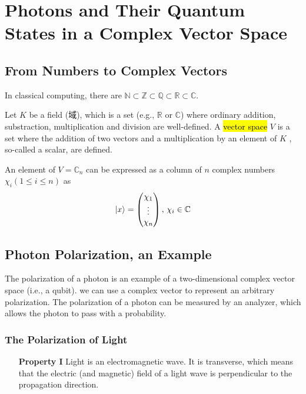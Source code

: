 \newpage
\section{Photons and Their Quantum States in a Complex Vector Space}

\subsection*{From Numbers to Complex Vectors}

In classical computing, there are $\mathbb{N}\subset \mathbb{Z}\subset \mathbb{Q}\subset \mathbb{R}\subset \mathbb{C} $. 

Let $K$ be a field (域), which is a set (e.g., $\mathbb{R}$ or $\mathbb{C}$) where ordinary addition, substraction, multiplication and division are well-defined. A \hl{vector space} $V$ is a set where the addition of two vectors and a multiplication by an element of $K$ , so-called a scalar, are defined.

An element of $V = \mathbb{C}_n$ can be expressed as a column of $n$ complex numbers  $\chi_i (1 \le i \le n)$ as
\begin{align*}
    \ket{x}=\begin{pmatrix}
        \chi_1 \\ \vdots \\ \chi_n
    \end{pmatrix},\, \chi_i \in \mathbb{C}
\end{align*}


\subsection{Photon Polarization, an Example}
The polarization of a photon is an example of a two-dimensional complex vector space (i.e., a qubit). we can use a complex vector to represent an arbitrary polarization. The polarization of a photon can be measured by an analyzer, which allows the photon to pass with a probability.

\subsubsection{The Polarization of Light}
\begin{itemize}
    \item [\textbf{Property I}] Light is an electromagnetic wave. It is transverse, which means that the electric (and magnetic)  field of a light wave is perpendicular to the propagation direction. 
\end{itemize}

